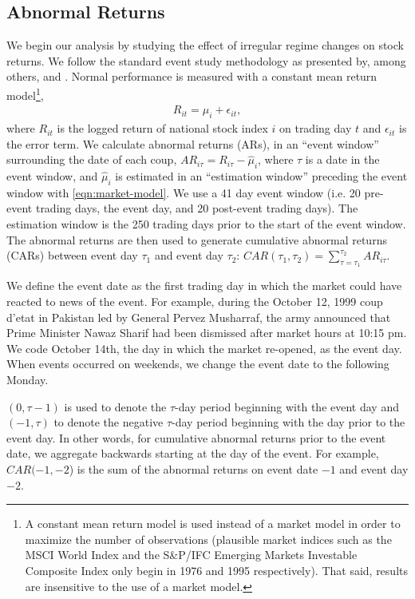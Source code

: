 \documentclass[12pt,final,fleqn]{article}
\theoremstyle{plain}
\begin{document}
\subsection{Abnormal Returns} \label{subsec:abnormal-returns}
We begin our analysis by studying the effect of irregular regime changes on stock returns. We follow the standard event study methodology as presented by, among others, \citet{mackinlay1997event} and \citet{campbell1997econometrics}. Normal performance is measured with a constant mean return model\footnote{A constant mean return model is used instead of a market model in order to maximize the number of observations (plausible market indices such as the MSCI World Index and the S\&P/IFC Emerging Markets Investable Composite Index only begin in 1976 and 1995 respectively). That said, results are insensitive to the use of a market model.},
\begin{align} \label{eqn:market-model}
R_{it}=\mu_{i}+\epsilon_{it},
\end{align}
where $R_{it}$ is the logged return of national stock index $i$ on trading day $t$ and $\epsilon_{it}$ is the error term. We calculate abnormal returns (ARs), in an ``event window'' surrounding the date of each coup, $AR_{i\tau}=R_{i\tau}-\widehat{\mu}_i$, where $\tau$ is a date in the event window, and $\widehat{\mu}_i$ is estimated in an ``estimation window'' preceding the event window with \autoref{eqn:market-model}. We use a 41 day event window (i.e. 20 pre-event trading days, the event day, and 20 post-event trading days). The estimation window is the 250 trading days prior to the start of the event window. The abnormal returns are then used to generate cumulative abnormal returns (CARs) between event day $\tau_1$ and event day $\tau_2$: $CAR(\tau_1,\tau_2)=\sum_{\tau=\tau_1}^{\tau_2}AR_{i\tau}$.

We define the event date as the first trading day in which the market could have reacted to news of the event. For example, during the October 12, 1999 coup d'etat in Pakistan led by General Pervez Musharraf, the army announced that Prime Minister Nawaz Sharif had been dismissed after market hours at 10:15 pm. We code October 14th, the day in which the market re-opened, as the event day. When events occurred on weekends, we change the event date to the following Monday.

$(0,\tau-1)$ is used to denote the $\tau$-day period beginning with the event day and $(-1,\tau)$ to denote the negative $\tau$-day period beginning with the day prior to the event day. In other words, for cumulative abnormal returns prior to the event date, we aggregate backwards starting at the day of the event. For example, $CAR(-1,-2$) is the sum of the abnormal returns on event date $-1$ and event day $-2$.
\end{document}
